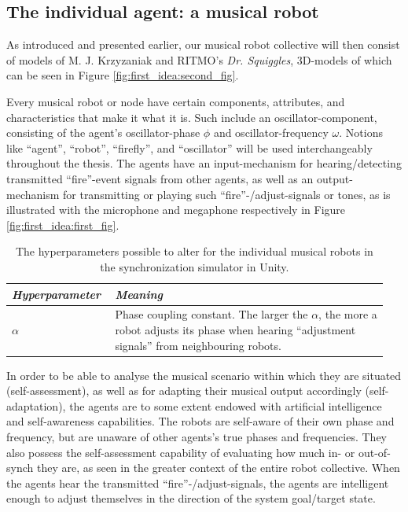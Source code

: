 	\subsection{The individual agent: a musical robot}
	\label{subsec:agent}

	As introduced and presented earlier, our musical robot collective will then consist of models of M. J. Krzyzaniak and RITMO's \textit{Dr. Squiggles}, 3D-models of which can be seen in Figure \ref{fig:first_idea:second_fig}.

	Every musical robot or node have certain components, attributes, and characteristics that make it what it is. Such include an oscillator-component, consisting of the agent's oscillator-phase $\phi$ and oscillator-frequency $\omega$. Notions like ``agent'', ``robot'', ``firefly'', and ``oscillator'' will be used interchangeably throughout the thesis. The agents have an input-mechanism for hearing/detecting transmitted ``fire''-event signals from other agents, as well as an output-mechanism for transmitting or playing such ``fire''-/adjust-signals or tones, as is illustrated with the microphone and megaphone respectively in Figure \ref{fig:first_idea:first_fig}.
	
	\begin{table}[ht]
		\centering
		\begin{tabular}{p{0.25\linewidth} | p{0.7\linewidth}}
		  \textit{\textbf{Hyperparameter}}  & \textit{\textbf{Meaning}} \\ \hline
		  $\alpha$ & Phase coupling constant. The larger the $\alpha$, the more a robot adjusts its phase when hearing ``adjustment signals'' from neighbouring robots.
		\end{tabular}
		\caption{The hyperparameters possible to alter for the individual musical robots in the synchronization simulator in Unity.}
		\label{tab:synchrony_robot_hyperparameters}
	\end{table}
	
	In order to be able to analyse the musical scenario within which they are situated (self-assessment), as well as for adapting their musical output accordingly (self-adaptation), the agents are to some extent endowed with artificial intelligence and self-awareness capabilities. The robots are self-aware of their own phase and frequency, but are unaware of other agents's true phases and frequencies. They also possess the self-assessment capability of evaluating how much in- or out-of-synch they are, as seen in the greater context of the entire robot collective. When the agents hear the transmitted ``fire''-/adjust-signals, the agents are intelligent enough to adjust themselves in the direction of the system goal/target state.

